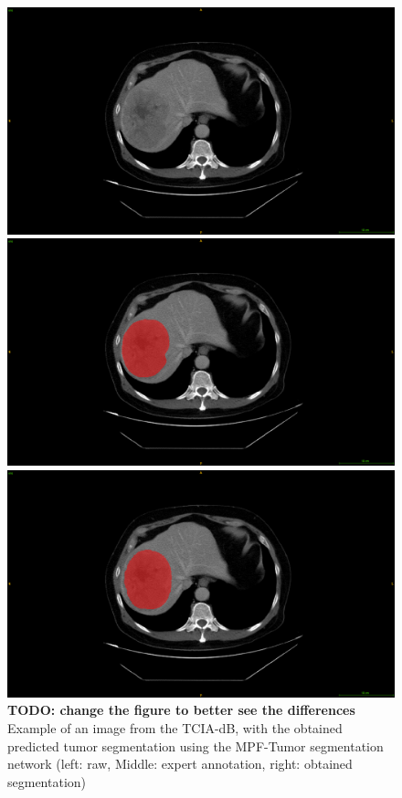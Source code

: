 \documentclass[]{article}
\begin{document}
\begin{figure}
\begin{minipage}{0.3\linewidth}
\includegraphics[width=\linewidth]{./images/image13.png}
\end{minipage}
\hspace{0.1cm}
\begin{minipage}{0.3\linewidth}
\includegraphics[width=\linewidth]{./images/image10.png}
\end{minipage}
\hspace{0.1cm}
\begin{minipage}{0.3\linewidth}
\includegraphics[width=\linewidth]{./images/image7.png}
\end{minipage}
\caption{\textbf{TODO: change the figure to better see the differences}
Example of an image from the TCIA-dB, with the obtained predicted tumor
segmentation using the MPF-Tumor segmentation network (left: raw,
Middle: expert annotation, right: obtained segmentation)}
\label{fig:TCIAMultiphaseTumorPred}
\end{figure}
\end{document}
